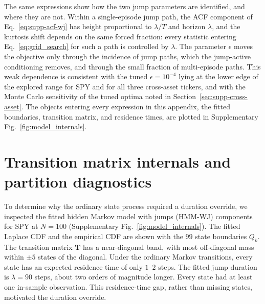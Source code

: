 The same expressions show how the two jump parameters are identified,
and where they are not. Within a single-episode jump path, the ACF
component of Eq.~\eqref{eq:supp-acf-wj} has height proportional to
$\lambda / T$ and horizon $\lambda$, and the kurtosis shift depends
on the same forced fraction: every statistic entering
Eq.~\eqref{eq:grid_search} for such a path is controlled by
$\lambda$. The parameter $\epsilon$ moves the objective only through
the incidence of jump paths, which the jump-active conditioning
removes, and through the small fraction of multi-episode paths. This
weak dependence is consistent with the tuned $\epsilon = 10^{-4}$
lying at the lower edge of the explored range for SPY and for all
three cross-asset tickers, and with the Monte Carlo sensitivity of
the tuned optima noted in
Section~\ref{sec:supp-cross-asset}. The objects entering every
expression in this appendix, the fitted boundaries, transition
matrix, and residence times, are plotted in
Supplementary Fig.~\ref{fig:model_internals}.


\section{Transition matrix internals and partition diagnostics}
\label{sec:supp-transitions}

To determine why the ordinary state process required a duration
override, we inspected the fitted hidden Markov model with jumps
(HMM-WJ) components for SPY at
$N=100$ (Supplementary Fig.~\ref{fig:model_internals}). The fitted Laplace CDF and the
empirical CDF are shown with the $99$ state boundaries $Q_k$. The transition matrix
$\mathbf{T}$ has a near-diagonal band, with most off-diagonal mass
within $\pm5$ states of the diagonal. Under the ordinary Markov
transitions, every state has an expected residence time of only
$1$--$2$ steps. The fitted jump duration is $\lambda=90$ steps, about two
orders of magnitude longer. Every state had at least one in-sample
observation. This residence-time gap, rather than missing states,
motivated the duration override.

